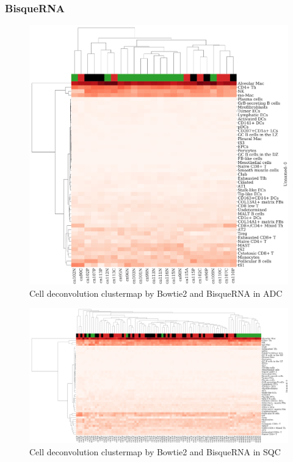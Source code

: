 \documentclass[a4paper]{article}
\begin{document}
            \subsubsection{BisqueRNA}
                \begin{figure}[htbp]
                    \centering
                    \includegraphics[width=0.6 \linewidth]{figures/BisqueRNA/clustermap/Bowtie2.ADC.cluster.pdf}
                    \caption{Cell deconvolution clustermap by Bowtie2 and BisqueRNA in ADC}
                    \label{fig:Deconvolution-BisqueRNA-Bowtie2-cluster-ADC}
                \end{figure}

                \begin{figure}[htbp]
                    \centering
                    \includegraphics[width=\linewidth]{figures/BisqueRNA/clustermap/Bowtie2.SQC.cluster.pdf}
                    \caption{Cell deconvolution clustermap by Bowtie2 and BisqueRNA in SQC}
                    \label{fig:Deconvolution-BisqueRNA-Bowtie2-cluster-SQC}
                \end{figure}
\end{document}
